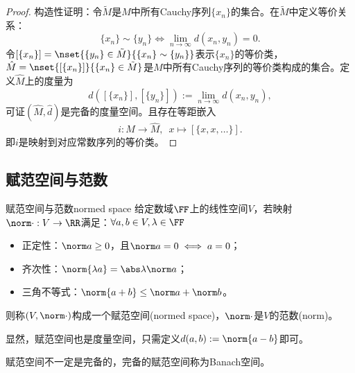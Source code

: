 \begin{proof}
    构造性证明：令$\tilde M$是$M$中所有Cauchy序列$\{x_n\}$的集合。在$\tilde M$中定义等价关系：
    \[
        \{x_n\}\sim\{y_n\}\iff\lim_{n\to\infty}d(x_n,y_n)=0.
    \]
    令$[\{x_n\}]=\nset{\{y_n\}\in\tilde M}{\{x_n\}\sim\{y_n\}}$表示$\{x_n\}$的等价类，$\hat M=\nset{[\{x_n\}]}{\{x_n\}\in\tilde M}$是$M$中所有Cauchy序列的等价类构成的集合。定义$\hat M$上的度量为
    \[
        \hat d([\{x_n\}],[\{y_n\}]):=\lim_{n\to\infty}d(x_n,y_n),
    \]
    可证$(\hat M,\hat d)$是完备的度量空间。且存在等距嵌入
    \[
        i:M\to\hat M,\enspace x\mapsto[\{x,x,\ldots\}].
    \]
    即$i$是映射到对应常数序列的等价类。
\end{proof}

\subsection{赋范空间与范数}

\begin{definition}
    {赋范空间与范数}{normed space}
    给定数域$\FF$上的线性空间$V$，若映射$\norm\cdot:V\to\RR$满足：$\forall a,b\in V,\lambda\in\FF$
    \begin{itemize}
        \item 正定性：$\norm a\geq 0$，且$\norm a=0\iff a=0$；
        \item 齐次性：$\norm{\lambda a}=\abs\lambda\norm a$；
        \item 三角不等式：$\norm{a+b}\leq\norm a+\norm b$。
    \end{itemize}
    则称$(V,\norm\cdot)$构成一个赋范空间(normed space)，$\norm\cdot$是$V$的范数(norm)。
\end{definition}

\begin{corollary}
    显然，赋范空间也是度量空间，只需定义$d(a,b):=\norm{a-b}$即可。
\end{corollary}
\begin{remark}
    赋范空间不一定是完备的，完备的赋范空间称为Banach空间。
\end{remark}


